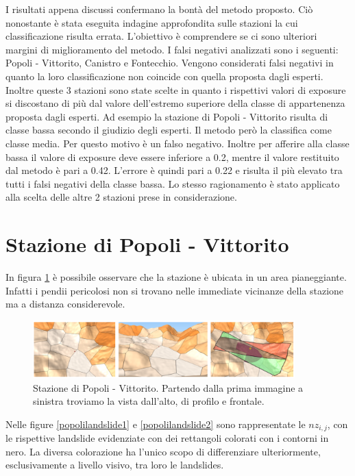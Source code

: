 I risultati appena discussi confermano la bontà del metodo proposto. Ciò nonostante è stata eseguita indagine approfondita sulle stazioni la cui classificazione risulta errata. L'obiettivo è comprendere se ci sono ulteriori margini di miglioramento del metodo.
I falsi negativi analizzati sono i seguenti: Popoli - Vittorito, Canistro e Fontecchio. Vengono considerati falsi negativi in quanto la loro classificazione non coincide con quella proposta dagli esperti. Inoltre queste 3 stazioni sono state scelte in quanto i rispettivi valori di exposure  si discostano di più dal valore dell'estremo superiore della classe di appartenenza proposta dagli esperti. Ad esempio la stazione di Popoli - Vittorito risulta di classe bassa secondo il giudizio degli esperti. Il metodo però la classifica come classe media. Per questo motivo è un falso negativo. Inoltre per afferire alla classe bassa il valore di exposure deve essere inferiore a 0.2, mentre il valore restituito dal metodo è pari a 0.42. L'errore è quindi pari a 0.22 e risulta il più elevato tra tutti i falsi negativi della classe bassa. Lo stesso ragionamento è stato applicato alla scelta delle altre 2 stazioni prese in considerazione. 

\newpage
\section{Stazione di Popoli - Vittorito}
In figura \ref{Popoli_Final} è possibile osservare che la stazione è ubicata in un area pianeggiante. Infatti i pendii pericolosi non si trovano nelle immediate vicinanze della stazione ma a distanza considerevole. 

	\begin{figure}[h]
	\centering
	\includegraphics[width=0.9\textwidth]{images/PopoliFinal}
	\caption{Stazione di Popoli - Vittorito. Partendo dalla prima immagine a sinistra  troviamo la vista dall'alto, di profilo e frontale.}
	\label{Popoli_Final}
\end{figure}

Nelle figure \ref{popolilandslide1} e \ref{popolilandslide2} sono rappresentate le $nz_{i,j}$, con le rispettive landslide evidenziate con dei rettangoli colorati con i contorni in nero. La diversa colorazione ha l'unico scopo di differenziare ulteriormente, esclusivamente a livello visivo, tra loro le landslides.


